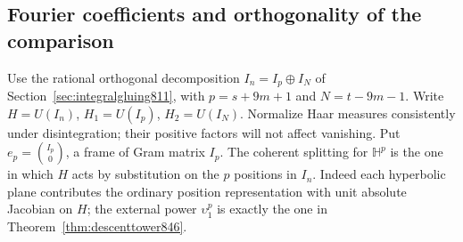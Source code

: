 \documentclass[a4paper,11pt]{article}
\theoremstyle{definition}
\theoremstyle{remark}
\numberwithin{equation}{section}
\begin{document}
\subsection{Fourier coefficients and orthogonality of the comparison}
\label{sec:testedcomparison850}
Use the rational orthogonal decomposition \(I_n=I_p\oplus I_N\)
of Section~\ref{sec:integralgluing811}, with \(p=s+9m+1\)
and \(N=t-9m-1\). Write \(H=U(I_n)\), \(H_1=U(I_p)\),
\(H_2=U(I_N)\). Normalize Haar measures consistently under
disintegration; their positive factors will not affect
vanishing. Put \(e_p=\binom{I_p}{0}\), a frame of Gram matrix
\(I_p\). The coherent splitting for \(\mathbb H^p\) is the
one in which \(H\) acts by substitution on the \(p\) positions
in \(I_n\). Indeed each hyperbolic plane contributes the ordinary
position representation with unit absolute Jacobian on \(H\);
the external power \(\upsilon_1^p\) is exactly the one in
Theorem~\ref{thm:descenttower846}.
\end{document}
